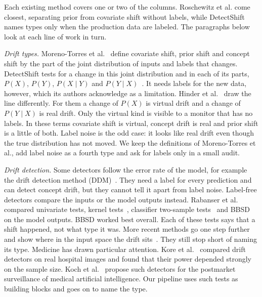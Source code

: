 \documentclass[pdflatex,referee,lineno,sn-basic]{sn-jnl}
\begin{document}
Each existing method covers one or two of the columns. Roschewitz et al. come closest, separating prior from covariate shift without labels, while DetectShift names types only when the production data are labeled. The paragraphs below look at each line of work in turn.

\emph{Drift types.} Moreno-Torres et al.~\citeyearpar{moreno2012unifying} define covariate shift, prior shift and concept shift by the part of the joint distribution of inputs and labels that changes. DetectShift tests for a change in this joint distribution and in each of its parts, $P(X)$, $P(Y)$, $P(X\mid Y)$ and $P(Y\mid X)$~\citep{maiapolo2023detectshift}. It needs labels for the new data, however, which its authors acknowledge as a limitation. Hinder et al.~\citeyearpar{hinder2024parta} draw the line differently. For them a change of $P(X)$ is virtual drift and a change of $P(Y\mid X)$ is real drift. Only the virtual kind is visible to a monitor that has no labels. In these terms covariate shift is virtual, concept drift is real and prior shift is a little of both. Label noise is the odd case: it looks like real drift even though the true distribution has not moved. We keep the definitions of Moreno-Torres et al., add label noise as a fourth type and ask for labels only in a small audit.

\emph{Drift detection.} Some detectors follow the error rate of the model, for example the drift detection method (DDM)~\citep{gama2004ddm}. They need a label for every prediction and can detect concept drift, but they cannot tell it apart from label noise. Label-free detectors compare the inputs or the model outputs instead. Rabanser et al.~\citeyearpar{rabanser2019failing} compared univariate tests, kernel tests~\citep{gretton2012kernel}, classifier two-sample tests~\citep{lopezpaz2017c2st} and BBSD on the model outputs. BBSD worked best overall. Each of these tests says that a shift happened, not what type it was. More recent methods go one step further and show where in the input space the drift sits~\citep{hinder2024partb,aguiar2024locality}. They still stop short of naming its type. Medicine has drawn particular attention. Kore et al.~\citeyearpar{kore2024medical} compared drift detectors on real hospital images and found that their power depended strongly on the sample size. Koch et al.~\citeyearpar{koch2024postmarket} propose such detectors for the postmarket surveillance of medical artificial intelligence. Our pipeline uses such tests as building blocks and goes on to name the type.
\end{document}
